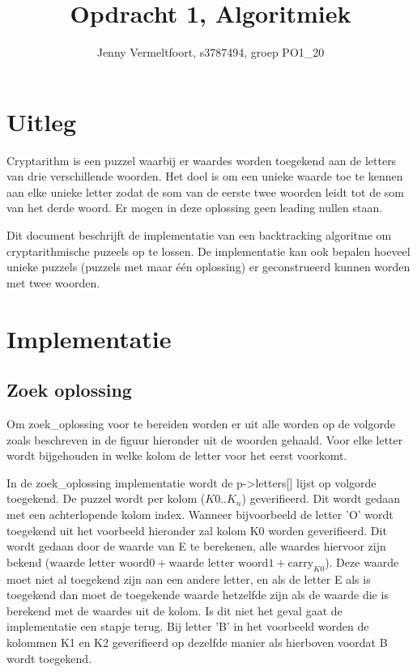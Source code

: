 \documentclass[twocolumn,10pt]{article}
\title{Opdracht 1, Algoritmiek}
\author{Jenny Vermeltfoort, s3787494, groep PO1\_20}
\begin{document}
\def\tablename{Tabel}

\maketitle

\section*{Uitleg}
Cryptarithm is een puzzel waarbij er waardes worden toegekend aan de letters van drie verschillende woorden. Het doel is om een unieke waarde toe te kennen aan elke unieke letter zodat de som van de eerste twee woorden leidt tot de som van het derde woord. Er mogen in deze oplossing geen leading nullen staan. 

Dit document beschrijft de implementatie van een backtracking algoritme om cryptarithmische puzeels op te lossen. De implementatie kan ook bepalen hoeveel unieke puzzels (puzzels met maar 
\'e\'en oplossing) er geconstrueerd kunnen worden met twee woorden.

\section*{Implementatie}

\subsection*{Zoek oplossing}
Om zoek\_oplossing voor te bereiden worden er uit alle worden op de volgorde zoals beschreven in de figuur hieronder uit de woorden gehaald. Voor elke letter wordt bijgehouden in welke kolom de letter voor het eerst voorkomt. 

In de zoek\_oplossing implementatie wordt de p->letters[] lijst op volgorde toegekend. De puzzel wordt per kolom ($K0.. K_n$) geverifieerd. Dit wordt gedaan met een achterlopende kolom index. Wanneer bijvoorbeeld de letter 'O' wordt toegekend uit het voorbeeld hieronder zal kolom K0 worden geverifieerd. Dit wordt gedaan door de waarde van E te berekenen, alle waardes hiervoor zijn bekend ($\text{waarde letter woord0} + \text{waarde letter woord1} + \text{carry}_{K0}$). Deze waarde moet niet al toegekend zijn aan een andere letter, en als de letter E als is toegekend dan moet de toegekende waarde hetzelfde zijn als de waarde die is berekend met de waardes uit de kolom. Is dit niet het geval gaat de implementatie een stapje terug. Bij letter 'B' in het voorbeeld worden de kolommen K1 en K2 geverifieerd op dezelfde manier als hierboven voordat B wordt toegekend.
\end{document}
